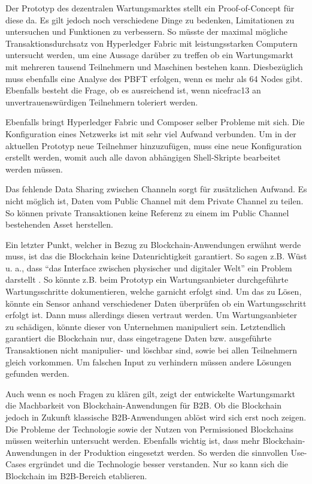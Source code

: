 Der Prototyp des dezentralen Wartungsmarktes stellt ein Proof-of-Concept für diese da. Es gilt jedoch noch verschiedene Dinge zu bedenken, Limitationen zu untersuchen und Funktionen zu verbessern. So müsste der maximal mögliche Transaktionsdurchsatz von Hyperledger Fabric mit leistungsstarken Computern untersucht werden, um eine Aussage darüber zu treffen ob ein Wartungsmarkt mit mehreren tausend Teilnehmern und Maschinen bestehen kann. Diesbezüglich muss ebenfalls eine Analyse des PBFT erfolgen, wenn es mehr als 64 Nodes gibt. Ebenfalls besteht die Frage, ob es ausreichend ist, wenn nicefrac{1}{3} an unvertrauenswürdigen Teilnehmern toleriert werden.

Ebenfalls bringt Hyperledger Fabric und Composer selber Probleme mit sich. Die Konfiguration eines Netzwerks ist mit sehr viel Aufwand verbunden. Um in der aktuellen Prototyp neue Teilnehmer hinzuzufügen, muss eine neue Konfiguration erstellt werden, womit auch alle davon abhängigen Shell-Skripte bearbeitet werden müssen. 

Das fehlende Data Sharing zwischen Channeln sorgt für zusätzlichen Aufwand. Es nicht möglich ist, Daten vom Public Channel mit dem Private Channel zu teilen. So können private Transaktionen keine Referenz zu einem im Public Channel bestehenden Asset herstellen.

Ein letzter Punkt, welcher in Bezug zu Blockchain-Anwendungen erwähnt werde muss, ist das die Blockchain keine Datenrichtigkeit garantiert. So sagen z.B. Wüst u. a., dass ``das Interface zwischen physischer und digitaler Welt'' ein Problem darstellt \cite{WustyouneedBlockchain2017}. So könnte z.B. beim Prototyp ein Wartungsanbieter durchgeführte Wartungsschritte dokumentieren, welche garnicht erfolgt sind. Um das zu Lösen, könnte ein Sensor anhand verschiedener Daten überprüfen ob ein Wartungsschritt erfolgt ist. Dann muss allerdings diesen vertraut werden. Um Wartungsanbieter zu schädigen, könnte dieser von Unternehmen manipuliert sein. Letztendlich garantiert die Blockchain nur, dass eingetragene Daten bzw. ausgeführte Transaktionen nicht manipulier- und löschbar sind, sowie bei allen Teilnehmern gleich vorkommen. Um falschen Input zu verhindern müssen andere Lösungen gefunden werden.

Auch wenn es noch Fragen zu klären gilt, zeigt der entwickelte Wartungsmarkt die Machbarkeit von Blockchain-Anwendungen für B2B. Ob die Blockchain jedoch in Zukunft klassische B2B-Anwendungen ablöst wird sich erst noch zeigen. Die Probleme der Technologie sowie der Nutzen von Permissioned Blockchains müssen weiterhin untersucht werden. Ebenfalls wichtig ist, dass mehr Blockchain-Anwendungen in der Produktion eingesetzt werden. So werden die sinnvollen Use-Cases ergründet und die Technologie besser verstanden. Nur so kann sich die Blockchain im B2B-Bereich etablieren.






